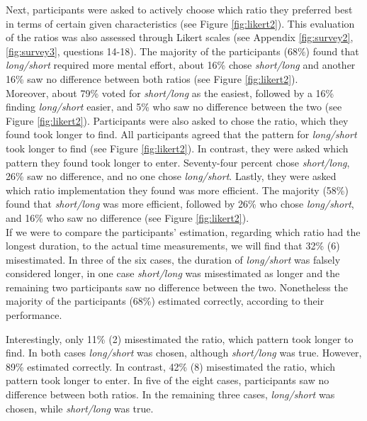 Next, participants were asked to actively choose which ratio they preferred best in terms of certain given characteristics (see Figure \ref{fig:likert2}). This evaluation of the ratios was also assessed through Likert scales (see Appendix \ref{fig:survey2}, \ref{fig:survey3}, questions 14-18). The majority of the participants (68\%) found that \textit{long/short} required more mental effort, about 16\% chose \textit{short/long} and another 16\% saw no difference between both ratios (see Figure \ref{fig:likert2}). \\
Moreover, about 79\% voted for \textit{short/long} as the easiest, followed by a 16\% finding \textit{long/short} easier, and 5\% who saw no difference between the two (see Figure \ref{fig:likert2}). Participants were also asked to chose the ratio, which they found took longer to find. All participants agreed that the pattern for \textit{long/short} took longer to find (see Figure \ref{fig:likert2}). In contrast, they were asked which pattern they found took longer to enter. Seventy-four percent chose \textit{short/long}, 26\% saw no difference, and no one chose \textit{long/short}. Lastly, they were asked which ratio implementation they found was more efficient. The majority (58\%) found that \textit{short/long} was more efficient, followed by 26\% who chose \textit{long/short}, and 16\% who saw no difference (see Figure \ref{fig:likert2}).\\

If we were to compare the participants' estimation, regarding which ratio had the longest duration, to the actual time measurements, we will find that 32\% (6) misestimated. In three of the six cases, the duration of \textit{long/short} was falsely  considered longer, in one case \textit{short/long} was misestimated as longer and the remaining two participants saw no difference between the two. Nonetheless the majority of the participants (68\%) estimated correctly, according to their performance.

Interestingly, only 11\% (2) misestimated the ratio, which pattern took longer to find. In both cases \textit{long/short} was chosen, although \textit{short/long} was true. However, 89\% estimated correctly. In contrast, 42\% (8) misestimated the ratio, which pattern took longer to enter. In five of the eight cases, participants saw no difference between both ratios. In the remaining three cases, \textit{long/short} was chosen, while \textit{short/long} was true. \\


